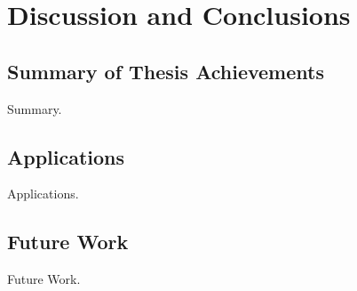 \chapter{Discussion and Conclusions}

\label{ch:conclusions}

\section{Summary of Thesis Achievements}

Summary.


\section{Applications}

Applications.


\section{Future Work}

Future Work. \cite{medan2017reduced}